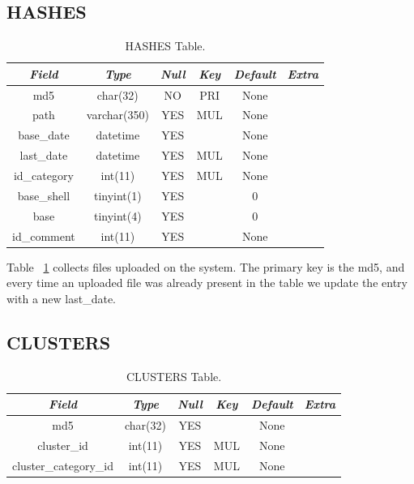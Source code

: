 \subsection{HASHES}
\begin{table}[H]
\begin{center}
\begin{tabular}{|c|c|c|c|c|c|}
\hline
 \textit{Field} & \textit{Type} & \textit{Null} & \textit{Key} &
 \textit{Default} & \textit{Extra} \\
\hline
md5 & char(32) & NO & PRI & None &  \\
path & varchar(350) & YES & MUL & None &  \\
base\_date & datetime & YES &  & None &  \\
last\_date & datetime & YES & MUL & None &  \\
id\_category & int(11) & YES & MUL & None &  \\
base\_shell & tinyint(1) & YES &  & 0 &  \\
base & tinyint(4) & YES &  & 0 &  \\
id\_comment & int(11) & YES &  & None &  \\
\hline
\end{tabular}
\caption{HASHES Table.\label{tab:HASHESCategories}}
\end{center}
\end{table}

Table ~\ref{tab:HASHESCategories} collects files uploaded on the system. The primary key is the md5, and every time an uploaded file was already present in the table we update the entry with a new last\_date.

\subsection{CLUSTERS}
\begin{table}[H]
\begin{center}
\begin{tabular}{|c|c|c|c|c|c|}
\hline
 \textit{Field} & \textit{Type} & \textit{Null} & \textit{Key} &
 \textit{Default} & \textit{Extra} \\
\hline
md5 & char(32) & YES &  & None &  \\
cluster\_id & int(11) & YES & MUL & None &  \\
cluster\_category\_id & int(11) & YES & MUL & None &  \\
\hline
\end{tabular}
\caption{CLUSTERS Table.\label{tab:CLUSTERSCategories}}
\end{center}
\end{table}

